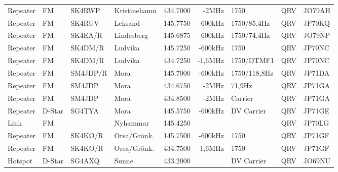 \begin{landscape}
\begin{longtable}{llllrrlcl}
	Repeater          & FM           & SK4RWP        & Kristinehamn        &          434.7000 &          -2MHz & 1750            &       QRV       & JO79AH           \\
	Repeater          & FM           & SK4RUV        & Leksand             &          145.7750 &        -600kHz & 1750/85,4Hz     &       QRV       & JP70KQ           \\
	Repeater          & FM           & SK4EA/R       & Lindesberg          &          145.6875 &        -600kHz & 1750/74,4Hz     &       QRV       & JO79NP           \\
	Repeater          & FM           & SK4DM/R       & Ludvika             &          145.7250 &        -600kHz & 1750            &       QRV       & JP70NC           \\
	Repeater          & FM           & SK4DM/R       & Ludvika             &          434.7250 &        -1,6MHz & 1750/DTMF1      &       QRV       & JP70NC           \\
	Repeater          & FM           & SM4JDP/R      & Mora                &          145.7000 &        -600kHz & 1750/118,8Hz    &       QRV       & JP71DA           \\
	Repeater          & FM           & SM4JDP        & Mora                &          434.6750 &          -2MHz & 71,9Hz          &       QRV       & JP71GA           \\
	Repeater          & FM           & SM4JDP        & Mora                &          434.8500 &          -2MHz & Carrier         &       QRV       & JP71GA           \\
	Repeater          & D-Star       & SG4TYA        & Mora                &          145.5750 &        -600kHz & DV Carrier      &       QRV       & JP71GE           \\
	Link              & FM           &               & Nyhammar            &          145.4250 &                &                 &       QRV       & JP70LG           \\
	Repeater          & FM           & SK4KO/R       & Orsa/Grönk.         &          145.7500 &        -600kHz & 1750            &       QRV       & JP71GF           \\
	Repeater          & FM           & SK4KO/R       & Orsa/Grönk.         &          434.7500 &        -1,6MHz & 1750            &       QRV       & JP71GF           \\
	Hotspot           & D-Star       & SG4AXQ        & Sunne               &          433.2000 &                & DV Carrier      &       QRV       & JO69NU           \\

\end{longtable}
\end{landscape}
